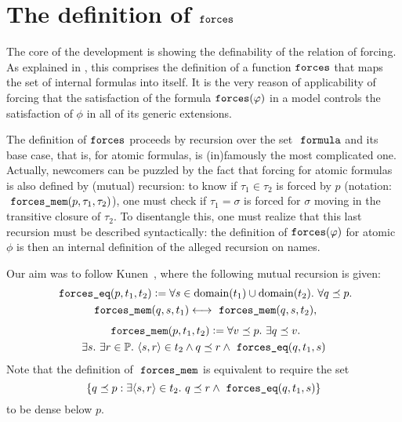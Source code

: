 \section{The definition of $\mathop{\mathtt{forces}}$}
\label{sec:definition-forces}

The core of the development is showing the definability of the
relation of forcing. As explained in
\cite[Sect.~8]{2019arXiv190103313G}, this comprises the 
definition of a function $\mathop{\mathtt{forces}}$ that maps the set of internal
formulas into itself. It is the very reason of applicability of
forcing that the satisfaction of the formula $\mathop{\mathtt{forces}}(\varphi)$ in a
model controls the satisfaction of $\phi$ in all of its generic
extensions.

The definition of $\mathop{\mathtt{forces}}$ proceeds by recursion
over the set $\formula$ and its base case, that is, for
atomic formulas, is (in)famously the most complicated one. Actually,
newcomers can be puzzled by the fact that forcing for atomic
formulas is also defined by (mutual) recursion: to know if $\tau_1\in\tau_2$ is
forced by $p$ (notation: $\forcesmem(p,\tau_1,\tau_2)$), one must check if $\tau_1=\sigma$ is forced for $\sigma$
moving in the transitive closure of $\tau_2$. To disentangle this, one
must realize that this last recursion must be described syntactically:
the definition of $\mathop{\mathtt{forces}}(\varphi)$ for atomic $\phi$ is then an
internal definition of the alleged recursion on names. 

Our aim was to follow Kunen~\cite[p.~257]{kunen2011set}, where the
following mutual recursion is given:
\begin{multline}\label{eq:def-forcing-equality}
  \forceseq (p,t_1,t_2) \defi 
  \forall s\in\dom(t_1)\cup\dom(t_2).\ \forall q\pleq p .\\
  \forcesmem(q,s,t_1)\lsii 
  \forcesmem(q,s,t_2),
\end{multline}
\begin{multline}\label{eq:def-forcing-membership}
  \forcesmem(p,t_1,t_2) \defi  \forall v\pleq p. \ \exists q\pleq v. \\
  \exists s.\ \exists r\in \PP .\ \lb s,r\rb \in
      t_2 \land q \pleq r \land \forceseq(q,t_1,s)
\end{multline}
Note that the definition of $\forcesmem$ is equivalent to require 
 the set 
\[
\{q\pleq p : \exists \lb s,r\rb\in t_2 . \ q\pleq r \land \forceseq(q,t_1,s)\}
\]
to be dense below $p$.

